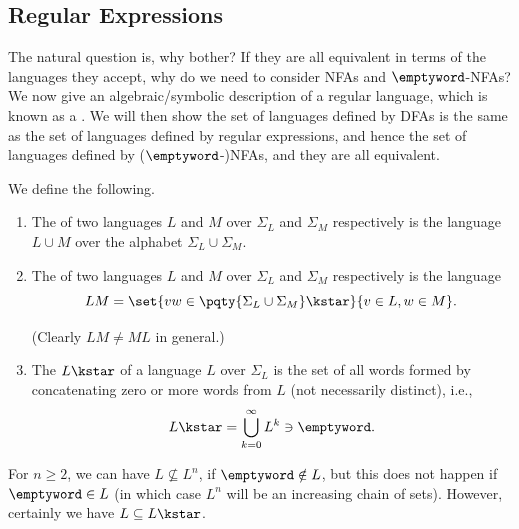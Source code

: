 \subsection{Regular Expressions}

The natural question is, why bother? If they are all equivalent in terms of the languages they accept, why do we need to consider NFAs and \(\emptyword\)-NFAs? We now give an algebraic/symbolic description of a regular language, which is known as a . We will then show the set of languages defined by DFAs is the same as the set of languages defined by regular expressions, and hence the set of languages defined by (\(\emptyword\)-)NFAs, and they are all equivalent.

\begin{definition}
    We define the following.

    \begin{enumerate}[label=(\arabic*)]
        \item The  of two languages \(L\) and \(M\) over \(\Sigma_L\) and \(\Sigma_M\) respectively is the language \(L \cup M\) over the alphabet \(\Sigma_L \cup \Sigma_M\).
        \item The  of two languages \(L\) and \(M\) over \(\Sigma_L\) and \(\Sigma_M\) respectively is the language
        \[
            LM = \set{vw \in \pqty{\Sigma_L \cup \Sigma_M}\kstar}{v \in L, w \in M}.
        \]

        (Clearly \(LM \neq ML\) in general.)

        \item The  \(L\kstar\) of a language \(L\) over \(\Sigma_L\) is the set of all words formed by concatenating zero or more words from \(L\) (not necessarily distinct), i.e.,
        \[
            L\kstar = \bigcup_{k = 0}^{\infty} L^k \ni \emptyword.
        \]
    \end{enumerate}
\end{definition}

\begin{remark}
    For \(n \geq 2\), we can have \(L \nsubseteq L^n\), if \(\emptyword \notin L\), but this does not happen if \(\emptyword \in L\) (in which case \(L^n\) will be an increasing chain of sets). However, certainly we have \(L \subseteq L\kstar\).
\end{remark}

